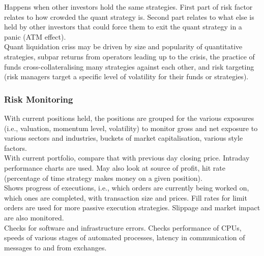 Happens when other investors hold the same strategies. First part of risk factor relates to how crowded the quant strategy is. Second part relates to what else is held by other investors that could force them to exit the quant strategy in a panic (ATM effect).\\

Quant liquidation criss may be driven by size and popularity of quantitative strategies, subpar returns from operators leading up to the crisis, the practice of funds cross-collateralising many strategies against each other, and risk targeting (risk managers target a specific level of volatility for their funds or strategies).

\subsubsection{Risk Monitoring}

 With current positions held, the positions are grouped for the various exposures (i.e., valuation, momentum level, volatility) to monitor gross and net exposure to various sectors and industries, buckets of market capitalisation, various style factors.\\

 With current portfolio, compare that with previous day closing price. Intraday performance charts are used. May also look at source of profit, hit rate (percentage of time strategy makes money on a given position).\\

 Shows progress of executions, i.e., which orders are currently being worked on, which ones are completed, with transaction size and prices. Fill rates for limit orders are used for more passive execution strategies. Slippage and market impact are also monitored.\\

 Checks for software and infrastructure errors. Checks performance of CPUs, speeds of various stages of automated processes, latency in communication of messages to and from exchanges.


